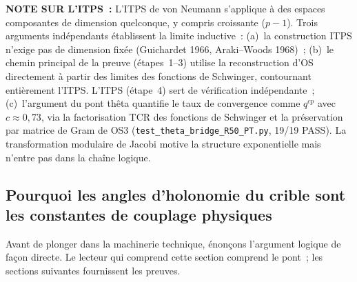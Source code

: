 \documentclass[12pt,a4paper]{article}
\begin{document}
\begin{statusbox}
\textbf{NOTE SUR L'ITPS~:}
  L'ITPS de von Neumann s'applique à des espaces composantes de
  dimension quelconque, y compris croissante ($p-1$). Trois arguments
  indépendants établissent la limite inductive~:
  (a)~la construction ITPS n'exige pas de dimension fixée
  (Guichardet 1966, Araki--Woods 1968)~;
  (b)~le chemin principal de la preuve (étapes~1--3) utilise la
  reconstruction d'OS directement à partir des limites des fonctions
  de Schwinger, contournant entièrement l'ITPS. L'ITPS (étape~4) sert
  de vérification indépendante~;
  (c)~l'argument du pont thêta quantifie le taux de convergence comme
  $q^{cp}$ avec $c \approx 0{,}73$, via la factorisation TCR des
  fonctions de Schwinger et la préservation par matrice de Gram de
  OS3 (\texttt{test\_theta\_bridge\_R50\_PT.py}, 19/19 PASS).
  La transformation modulaire de Jacobi motive la structure
  exponentielle mais n'entre pas dans la chaîne logique.
\end{statusbox}

\subsection{Pourquoi les angles d'holonomie du crible sont les constantes de couplage physiques}
\label{sec:ch9_why}

Avant de plonger dans la machinerie technique, énonçons l'argument
logique de façon directe. Le lecteur qui comprend cette section comprend
le pont~; les sections suivantes fournissent les preuves.
\end{document}
